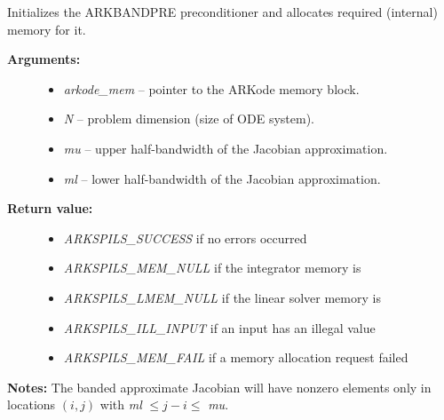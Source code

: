 \documentclass[letterpaper,10pt,english]{sphinxmanual}
\begin{document}
\begin{fulllineitems}
\label{c_interface/Preconditioners:ARKBandPrecInit}
Initializes the ARKBANDPRE preconditioner and
allocates required (internal) memory for it.
\begin{description}
\item[{\textbf{Arguments:}}] \leavevmode\begin{itemize}
\item {} 
\emph{arkode\_mem} -- pointer to the ARKode memory block.

\item {} 
\emph{N} -- problem dimension (size of ODE system).

\item {} 
\emph{mu} -- upper half-bandwidth of the Jacobian approximation.

\item {} 
\emph{ml} -- lower half-bandwidth of the Jacobian approximation.

\end{itemize}

\item[{\textbf{Return value:}}] \leavevmode\begin{itemize}
\item {} 
\emph{ARKSPILS\_SUCCESS} if no errors occurred

\item {} 
\emph{ARKSPILS\_MEM\_NULL} if the integrator memory is 

\item {} 
\emph{ARKSPILS\_LMEM\_NULL} if the linear solver memory is 

\item {} 
\emph{ARKSPILS\_ILL\_INPUT} if an input has an illegal value

\item {} 
\emph{ARKSPILS\_MEM\_FAIL} if a memory allocation request failed

\end{itemize}

\end{description}

\textbf{Notes:} The banded approximate Jacobian will have nonzero elements
only in locations $(i,j)$ with \emph{ml} $\le j-i \le$ \emph{mu}.

\end{fulllineitems}
\end{document}
